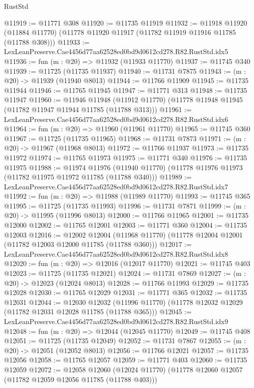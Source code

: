 \begin{lexlean}{RustStd}
\begin{coremodule}
@11919 := @11771 @308
@11920 := @11735 @11919
@11932 := @11918
    @11920
    (@11884 @11770)
    (@11778 @11920 @11917 (@11782 @11919 @11916 @11785 (@11788 @308)))
@11933 := LexLeanPreserve.Cae4456d77aa62528ed0bd9d0612cd278.R82.RustStd.idx5
@11936 := fun (m : @20) => @11932 (@11933 @11770)
@11937 := @11745 @340
@11939 := @11725 (@11735 @11937)
@11940 := @11731 @7875
@11943 := (m : @20) -> @11939 (@11940 @8013)
@11944 := @11766 @11909
@11945 := @11735 @11944
@11946 := @11765 @11945
@11947 := @11771 @313
@11948 := @11735 @11947
@11960 := @11946
    @11948
    (@11912 @11770)
    (@11778 @11948 @11945 (@11782 @11947 @11944 @11785 (@11788 @313)))
@11961 := LexLeanPreserve.Cae4456d77aa62528ed0bd9d0612cd278.R82.RustStd.idx6
@11964 := fun (m : @20) => @11960 (@11961 @11770)
@11965 := @11745 @360
@11967 := @11725 (@11735 @11965)
@11968 := @11731 @7873
@11971 := (m : @20) -> @11967 (@11968 @8013)
@11972 := @11766 @11937
@11973 := @11735 @11972
@11974 := @11765 @11973
@11975 := @11771 @340
@11976 := @11735 @11975
@11988 := @11974
    @11976
    (@11940 @11770)
    (@11778 @11976 @11973 (@11782 @11975 @11972 @11785 (@11788 @340)))
@11989 := LexLeanPreserve.Cae4456d77aa62528ed0bd9d0612cd278.R82.RustStd.idx7
@11992 := fun (m : @20) => @11988 (@11989 @11770)
@11993 := @11745 @365
@11995 := @11725 (@11735 @11993)
@11996 := @11731 @7871
@11999 := (m : @20) -> @11995 (@11996 @8013)
@12000 := @11766 @11965
@12001 := @11735 @12000
@12002 := @11765 @12001
@12003 := @11771 @360
@12004 := @11735 @12003
@12016 := @12002
    @12004
    (@11968 @11770)
    (@11778 @12004 @12001 (@11782 @12003 @12000 @11785 (@11788 @360)))
@12017 := LexLeanPreserve.Cae4456d77aa62528ed0bd9d0612cd278.R82.RustStd.idx8
@12020 := fun (m : @20) => @12016 (@12017 @11770)
@12021 := @11745 @403
@12023 := @11725 (@11735 @12021)
@12024 := @11731 @7869
@12027 := (m : @20) -> @12023 (@12024 @8013)
@12028 := @11766 @11993
@12029 := @11735 @12028
@12030 := @11765 @12029
@12031 := @11771 @365
@12032 := @11735 @12031
@12044 := @12030
    @12032
    (@11996 @11770)
    (@11778 @12032 @12029 (@11782 @12031 @12028 @11785 (@11788 @365)))
@12045 := LexLeanPreserve.Cae4456d77aa62528ed0bd9d0612cd278.R82.RustStd.idx9
@12048 := fun (m : @20) => @12044 (@12045 @11770)
@12049 := @11745 @408
@12051 := @11725 (@11735 @12049)
@12052 := @11731 @7867
@12055 := (m : @20) -> @12051 (@12052 @8013)
@12056 := @11766 @12021
@12057 := @11735 @12056
@12058 := @11765 @12057
@12059 := @11771 @403
@12060 := @11735 @12059
@12072 := @12058
    @12060
    (@12024 @11770)
    (@11778 @12060 @12057 (@11782 @12059 @12056 @11785 (@11788 @403)))

\end{coremodule}
\end{lexlean}
